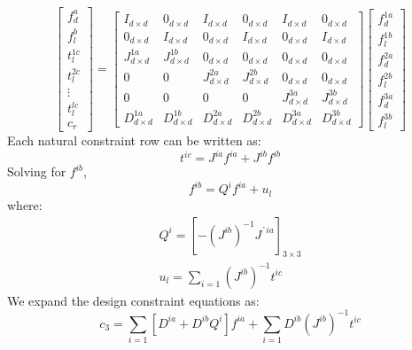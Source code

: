 \documentclass[]{article}
\begin{document}
\begin{equation}
\begin{bmatrix}
f_d^a		\\
f_l^b		\\
t_l^{1c}	\\
t_l^{2c}	\\
\vdots		\\
t_l^{lc}	\\
c_r
\end{bmatrix}
=
\begin{bmatrix}
	I_{d\times d}		&0_{d\times d}		&I_{d\times d}		&0_{d\times d}		&I_{d\times d}		&0_{d\times d} 	\\ 
	0_{d\times d}		&I_{d\times d}		&0_{d\times d} 		&I_{d\times d}		&0_{d\times d}		&I_{d\times d} 	\\ 
	J^{1a}_{d\times d}	&J^{1b}_{d\times d}	&0_{d\times d} 		&0_{d\times d}		&0_{d\times d}		&0_{d\times d} 	\\
	0					&0					&J^{2a}_{d\times d}	&J^{2b}_{d\times d}	&0_{d\times d}		&0_{d\times d}	\\ 
	0					&0					&0					&0					&J^{3a}_{d\times d}	&J^{3b}_{d\times d}\\ 
	D^{1a}_{d\times d}	&D^{1b}_{d\times d}	&D^{2a}_{d\times d}	&D^{2b}_{d\times d}	&D^{3a}_{d\times d}	&D^{3b}_{d\times d}	
\end{bmatrix}
\begin{bmatrix}
f_d^{1a} 	\\
f_l^{1b} 	\\
f_d^{2a}	\\
f_l^{2b}	\\
f_d^{3a} 	\\
f_l^{3b} 	
\end{bmatrix}
\label{eq:parallelVirtualModelEquation}
\end{equation}
Each natural constraint row can be written as:
\begin{equation}
t^{ic}=J^{ia}f^{ia}+J^{ib}f^{ib}	
\end{equation}
Solving for $f^{ib}$,
\begin{equation}
	\label{eq:fib}	
	f^{ib}=Q^if^{ia}+u_l
\end{equation}
where:
\begin{eqnarray}
Q^i=[-(J^{ib})^{-1}J^{ˆia}]_{3\times3}	\\	
u_l=\sum_{i=1}(J^{ib})^{-1}t^{ic}			
\end{eqnarray}
We expand the design constraint equations as:
\begin{equation}
c_3=\sum_{i=1}[D^{ia}+D^{ib}Q^i]f^{ia}+\sum_{i=1}D^{ib}(J^{ib})^{-1}t^{ic}
\label{eq:c3}
\end{equation}
\end{document}
